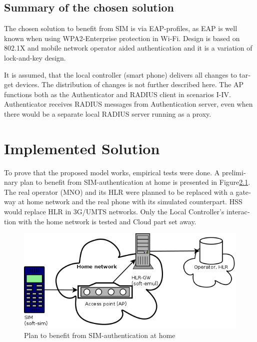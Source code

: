 \documentclass[12pt,a4paper,english]{tutthesis}
\begin{document}
\begin{otherlanguage}{english}
\section{Summary of the chosen solution}
\label{sec-4-7}


The chosen solution to benefit from SIM is via EAP-profiles, as EAP
is well known when using WPA2-Enterprise protection in Wi-Fi.
Design is based on 802.1X and mobile network operator aided
authentication
and it is a variation of lock-and-key design.


It is assumed, that  the local controller (smart phone)
delivers all changes to target devices.
The distribution of changes\cite{silverajan2015collaborative} is not
further described here.  The AP functions both as the Authenticator
and RADIUS client in scenarios I-IV.  Authenticator receives RADIUS
messages from Authentication server, even when there would be a
separate local RADIUS server running as a proxy.



\chapter{Implemented Solution}
\label{sec-5}


To prove that the proposed model works, empirical tests were done.
A preliminary plan to benefit from SIM-authentication at home is
presented in Figure\ref{fig:sim-pre}. The real operator (MNO) and its HLR were 
planned to be replaced with a gateway at home network and the real phone
with its simulated counterpart. HSS would replace HLR in 3G/UMTS
networks. 
Only the Local Controller's interaction with the home network is
tested and Cloud part set away.

\begin{figure}[htb]
\centering
\includegraphics[width=.9\linewidth]{phone-soft-hlr.png}
\caption{\label{fig:sim-pre}Plan to benefit from SIM-authentication at home}
\end{figure}


\end{otherlanguage}
\end{document}
